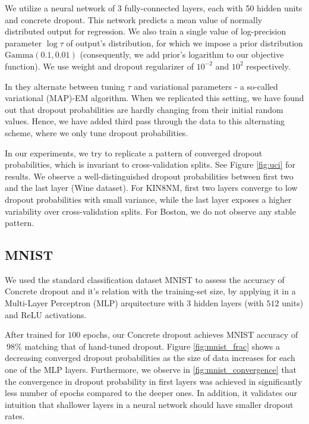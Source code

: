 \documentclass{article}
\begin{document}
We utilize a neural network of 3 fully-connected layers, each with 50 hidden units and concrete dropout. This network predicts a mean value of normally distributed output for regression. We also train a single value of log-precision parameter $\log \tau$ of output's distribution, for which we impose a prior distribution $\text{Gamma}(0.1, 0.01)$ (consequently, we add prior's logarithm to our objective function). We use weight and dropout regularizer of $10^{-2}$ and $10^2$ respectively.

In \cite{concrete} they alternate between tuning $\tau$ and variational parameters - a so-called variational (MAP)-EM algorithm. When we replicated this setting, we have found out that dropout probabilities are hardly changing from their initial random values. Hence, we have added third pass through the data to this alternating scheme, where we only tune dropout probabilities.

In our experiments, we try to replicate a pattern of converged dropout probabilities, which is invariant to cross-validation splits. See Figure \ref{fig:uci} for results. We observe a well-distinguished dropout probabilities between first two and the last layer (Wine dataset). For KIN8NM, first two layers converge to low dropout probabilities with small variance, while the last layer exposes a higher variability over cross-validation splits. For Boston, we do not observe any stable pattern.

\subsection{MNIST}
We used the standard classification dataset MNIST \cite{lecun-mnisthandwrittendigit-2010} to assess the accuracy of Concrete dropout and it's relation with the training-set size, by applying it in a Multi-Layer Perceptron (MLP) arquitecture with $3$ hidden layers (with $512$ units) and ReLU activations.

After trained for $100$ epochs, our Concrete dropout achieves MNIST accuracy of $~98\%$  matching that of hand-tuned dropout. Figure \ref{fig:mnist_frac} shows a decreasing converged dropout probabilities as the size of data increases for each one of the MLP layers. Furthermore, we observe in \ref{fig:mnist_convergence} that the convergence in dropout probability in first layers was achieved in significantly less number of epochs compared to the deeper ones. In addition, it validates our intuition that shallower layers in a neural network should have smaller dropout rates. 
\end{document}
